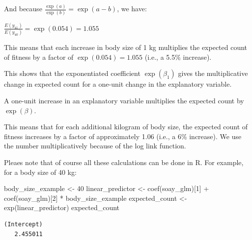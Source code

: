 \documentclass[
  letterpaper,
  8pt,
  a4paper]{book}
\newenvironment{Shaded}{\begin{snugshade}}{\end{snugshade}}
\newcommand{\DecValTok}[1]{\textcolor[rgb]{0.68,0.00,0.00}{#1}}
\newcommand{\FunctionTok}[1]{\textcolor[rgb]{0.28,0.35,0.67}{#1}}
\newcommand{\NormalTok}[1]{\textcolor[rgb]{0.00,0.23,0.31}{#1}}
\newcommand{\OtherTok}[1]{\textcolor[rgb]{0.00,0.23,0.31}{#1}}
\newcommand{\SpecialCharTok}[1]{\textcolor[rgb]{0.37,0.37,0.37}{#1}}
\begin{document}
And because \(\frac{\exp(a)} {\exp(b)} = \exp(a - b)\), we have:

\(\frac{E(y_{41})}{E(y_{40})} = \exp(0.054) = 1.055\)

This means that each increase in body size of 1 kg multiplies the
expected count of fitness by a factor of \(\exp(0.054) = 1.055\) (i.e.,
a 5.5\% increase).

This shows that the exponentiated coefficient \(\exp(\beta_1)\) gives
the multiplicative change in expected count for a one-unit change in the
explanatory variable.

\begin{tcolorbox}[enhanced jigsaw, arc=.35mm, bottomrule=.15mm, bottomtitle=1mm, breakable, colback=white, colbacktitle=quarto-callout-important-color!10!white, colframe=quarto-callout-important-color-frame, coltitle=black, left=2mm, leftrule=.75mm, opacityback=0, opacitybacktitle=0.6, rightrule=.15mm, title=\textcolor{quarto-callout-important-color}{\faExclamation}\hspace{0.5em}{Important}, titlerule=0mm, toprule=.15mm, toptitle=1mm]

A one-unit increase in an explanatory variable multiplies the expected
count by \(\exp(\beta)\).

\end{tcolorbox}

This means that for each additional kilogram of body size, the expected
count of fitness increases by a factor of approximately 1.06 (i.e., a
6\% increase). We use the number multiplicatively because of the log
link function.

Pleaes note that of course all these calculations can be done in R. For
example, for a body size of 40 kg:

\begin{Shaded}
\begin{Highlighting}[]
\NormalTok{body\_size\_example }\OtherTok{\textless{}{-}} \DecValTok{40}
\NormalTok{linear\_predictor }\OtherTok{\textless{}{-}} \FunctionTok{coef}\NormalTok{(soay\_glm)[}\DecValTok{1}\NormalTok{] }\SpecialCharTok{+} \FunctionTok{coef}\NormalTok{(soay\_glm)[}\DecValTok{2}\NormalTok{] }\SpecialCharTok{*}\NormalTok{ body\_size\_example}
\NormalTok{expected\_count }\OtherTok{\textless{}{-}} \FunctionTok{exp}\NormalTok{(linear\_predictor)}
\NormalTok{expected\_count}
\end{Highlighting}
\end{Shaded}

\begin{verbatim}
(Intercept) 
   2.455011 
\end{verbatim}
\end{document}
